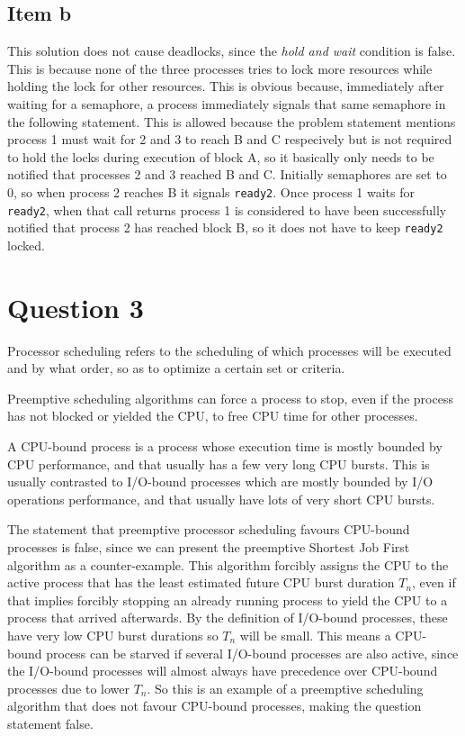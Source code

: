 {\subsection{Item b}
This solution does not cause deadlocks, since the \emph{hold and wait} condition is false. This is because none of the three processes tries to lock more resources while holding the lock for other resources. This is obvious because, immediately after waiting for a semaphore, a process immediately signals that same semaphore in the following statement. This is allowed because the problem statement mentions process 1 must wait for 2 and 3 to reach B and C respecively but is not required to hold the locks during execution of block A, so it basically only needs to be notified that processes 2 and 3 reached B and C. Initially semaphores are set to 0, so when process 2 reaches B it signals \texttt{ready2}. Once process 1 waits for \texttt{ready2}, when that call returns process 1 is considered to have been successfully notified that process 2 has reached block B, so it does not have to keep \texttt{ready2} locked.

\section{Question 3}
Processor scheduling refers to the scheduling of which processes will be executed and by what order, so as to optimize a certain set or criteria.

Preemptive scheduling algorithms can force a process to stop, even if the process has not blocked or yielded the CPU, to free CPU time for other processes.

A CPU-bound process is a process whose execution time is mostly bounded by CPU performance, and that usually has a few very long CPU bursts. This is usually contrasted to I/O-bound processes which are mostly bounded by I/O operations performance, and that usually have lots of very short CPU bursts.

The statement that preemptive processor scheduling favours CPU-bound processes is false, since we can present the preemptive Shortest Job First algorithm as a counter-example. This algorithm forcibly assigns the CPU to the active process that has the least estimated future CPU burst duration $T_n$, even if that implies forcibly stopping an already running process to yield the CPU to a process that arrived afterwards. By the definition of I/O-bound processes, these have very low CPU burst durations so $T_n$ will be small. This means a CPU-bound process can be starved if several I/O-bound processes are also active, since the I/O-bound processes will almost always have precedence over CPU-bound processes due to lower $T_n$. So this is an example of a preemptive scheduling algorithm that does not favour CPU-bound processes, making the question statement false.

}
